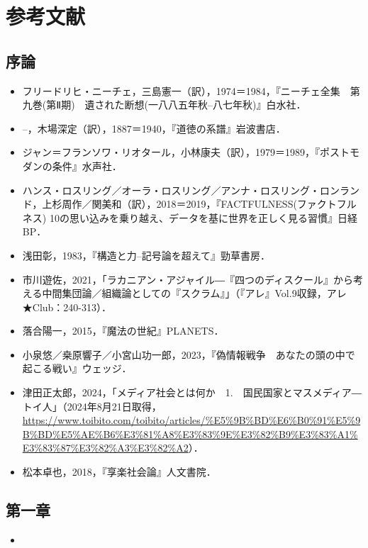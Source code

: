 \section{参考文献}\label{ux53c2ux8003ux6587ux732e}

\subsection{序論}\label{ux5e8fux8ad6}

\begin{itemize}
\tightlist
\item
  フリードリヒ・ニーチェ，三島憲一（訳），1974＝1984，『ニーチェ全集　第九巻(第Ⅱ期)　遺された断想(一八八五年秋--八七年秋)』白水社．
\item
  --，木場深定（訳），1887＝1940，『道徳の系譜』岩波書店．
\item
  ジャン＝フランソワ・リオタール，小林康夫（訳），1979＝1989，『ポストモダンの条件』水声社．
\item
  ハンス・ロスリング／オーラ・ロスリング／アンナ・ロスリング・ロンランド，上杉周作／関美和（訳），2018＝2019，『FACTFULNESS(ファクトフルネス)
  10の思い込みを乗り越え、データを基に世界を正しく見る習慣』日経BP．
\item
  浅田彰，1983，『構造と力--記号論を超えて』勁草書房．
\item
  市川遊佐，2021，「ラカニアン・アジャイル―『四つのディスクール』から考える中間集団論／組織論としての『スクラム』」（『アレ』Vol.9収録，アレ★Club：240-313）．
\item
  落合陽一，2015，『魔法の世紀』PLANETS．
\item
  小泉悠／桒原響子／小宮山功一郎，2023，『偽情報戦争　あなたの頭の中で起こる戦い』ウェッジ．
\item
  津田正太郎，2024，「メディア社会とは何か　1.　国民国家とマスメディア―トイ人」（2024年8月21日取得，\url{https://www.toibito.com/toibito/articles/\%E5\%9B\%BD\%E6\%B0\%91\%E5\%9B\%BD\%E5\%AE\%B6\%E3\%81\%A8\%E3\%83\%9E\%E3\%82\%B9\%E3\%83\%A1\%E3\%83\%87\%E3\%82\%A3\%E3\%82\%A2}）．
\item
  松本卓也，2018，『享楽社会論』人文書院．
\end{itemize}

\subsection{第一章}\label{ux7b2cux4e00ux7ae0}

\begin{itemize}
\tightlist
\item
\end{itemize}

